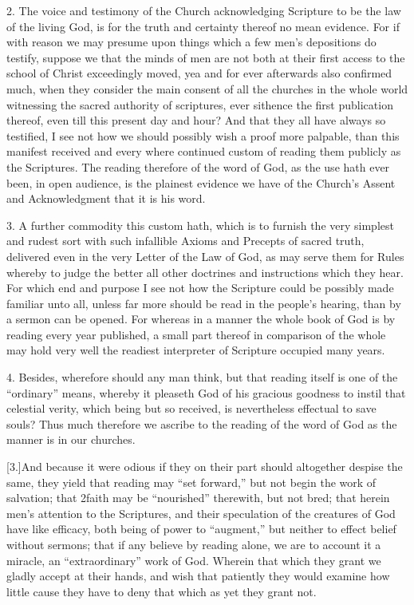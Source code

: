 2. The voice and testimony of the Church acknowledging Scripture to be the law of the living God, is for the truth and certainty thereof no mean evidence. For if with reason we may presume upon things which a few men’s depositions do testify, suppose we that the minds of men are not both at their first access to the school of Christ exceedingly moved, yea and for ever afterwards also confirmed much, when they consider the main consent of all the churches in the whole world witnessing the sacred authority of scriptures, ever sithence the first publication thereof, even till this present day and hour? And that they all have always so testified, I see not how we should possibly wish a proof more palpable, than this manifest received and every where continued custom of reading them publicly as the Scriptures. The reading therefore of the word of God, as the use hath ever been, in open audience, is the plainest evidence we have of the Church’s Assent and Acknowledgment that it is his word.

3. A further commodity this custom hath, which is to furnish the very simplest and rudest sort with such infallible Axioms and Precepts of sacred truth, delivered even in the very Letter of the Law of God, as may serve them for Rules whereby to judge the better all other doctrines and instructions which they hear. For which end and purpose I see not  how the Scripture could be possibly made familiar unto all, unless far more should be read in the people’s hearing, than by a sermon can be opened.
 For whereas in a manner the whole book of God is by reading every year published, a small part thereof in comparison of the whole may hold very well the readiest interpreter of Scripture occupied many years.

4. Besides, wherefore should any man think, but that reading itself is one of the “ordinary” means, whereby it pleaseth God of his gracious goodness to instil that celestial verity, which being but so received, is nevertheless effectual to save souls? Thus much therefore we ascribe to the reading of the word of God as the manner is in our churches.

[3.]And because it were odious if they on their part should altogether despise the same, they yield that reading may “set forward,” but not begin the work of salvation; that 2faith may be “nourished” therewith, but not bred; that herein men’s attention to the Scriptures, and their speculation of the creatures of God have like efficacy, both being of power to “augment,” but neither to effect belief without sermons; that if any believe by reading alone, we are to account it a miracle, an “extraordinary” work of God. Wherein that which they grant we gladly accept at their hands, and wish that patiently they would examine how little cause they have to deny that which as yet they grant not.

